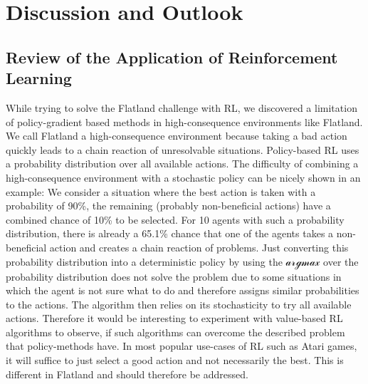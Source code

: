 %
%

\chapter{Discussion and Outlook}
\label{chap.diskussion}
\section{Review of the Application of Reinforcement Learning}\label{discussion_rl}
While trying to solve the Flatland challenge with RL, we discovered a limitation of policy-gradient based methods in high-consequence environments like Flatland. 
We call Flatland a high-consequence environment because taking a bad action quickly leads to a chain reaction of unresolvable situations. Policy-based RL uses a probability distribution over all available actions. The difficulty of combining a high-consequence environment with a stochastic policy can be nicely shown in an example: We consider a situation where the best action is taken with a probability of 90\%, the remaining (probably non-beneficial actions) have a combined chance of 10\% to be selected. For 10 agents with such a probability distribution, there is already a 65.1\% chance that one of the agents takes a non-beneficial action and creates a chain reaction of problems. Just converting this probability distribution into a deterministic policy by using the $\mathcal{argmax}$ over the probability distribution does not solve the problem due to some situations in which the agent is not sure what to do and therefore assigns similar probabilities to the actions. The algorithm then relies on its stochasticity to try all available actions. Therefore it would be interesting to experiment with value-based RL algorithms to observe, if such algorithms can overcome the described problem that policy-methods have. In most popular use-cases of RL such as Atari games, it will suffice to just select a good action and not necessarily the best. This is different in Flatland and should therefore be addressed.

